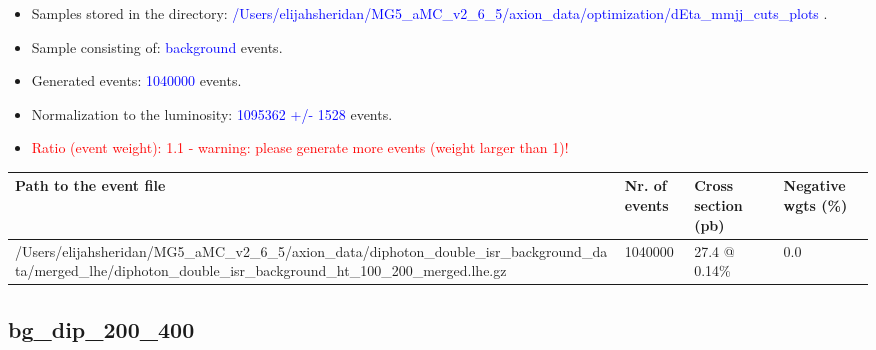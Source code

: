 \documentclass[a4paper, 10pt]{article}
\begin{document}
\begin{itemize}
  \item Samples stored in the directory: \textcolor{blue}{/\-Users/\-elijahsheridan/\-MG5\_aMC\_v2\_6\_5/\-axion\_data/\-optimization/\-dEta\_mmjj\_cuts\_plots} .
   \item Sample consisting of: \textcolor{blue}{background}  events.
   \item Generated events: \textcolor{blue}{1040000 }  events.
   \item Normalization to the luminosity: \textcolor{blue}{1095362}\textcolor{blue}{ +/\-- }\textcolor{blue}{1528 }  events.
   \item\textcolor{red}{Ratio (event weight): }\textcolor{red}{1.1 }\textcolor{red}{ - warning: please generate more events (weight larger than 1)!}
\textcolor{red}{}
\end{itemize}
\begin{table}[H]
  \begin{center}
    \begin{tabular}{|m{55.0mm}|m{25.0mm}|m{30.0mm}|m{30.0mm}|}
      \hline
      {\cellcolor{yellow}         Path to the event file}& {\cellcolor{yellow}         Nr. of events}& {\cellcolor{yellow}         Cross section (pb)}& {\cellcolor{yellow}         Negative wgts (\%)}\\
      \hline
      {\cellcolor{white}          /\-Users/\-elijahsheridan/\-MG5\_aMC\_v2\_6\_5/\-axion\_data/\-diphoton\_double\_isr\_background\_data/\-merged\_lhe/\-diphoton\_double\_isr\_background\_ht\_100\_200\_merged.lhe.gz}& {\cellcolor{white}          1040000}& {\cellcolor{white}          27.4 @ 0.14\%}& {\cellcolor{white}          0.0}\\
\hline
    \end{tabular}
  \end{center}
\end{table}

\subsection{ bg\_dip\_200\_400}
\end{document}
